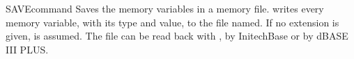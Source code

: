 \begin{XbaseEntry}{SAVE}{command}
Saves the memory variables in a memory file.
\Syntax
{}
\Usage
{} writes every memory variable, with its type and value, to the
file named.  If no extension is given,  is assumed.  The file can
be read back with , by InitechBase or by dBASE III PLUS.
\Examples
{}
\end{XbaseEntry}

